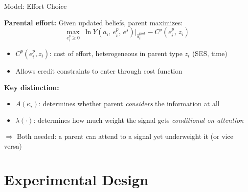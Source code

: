\documentclass[aspectratio=169,11pt]{beamer}
\begin{document}
\begin{frame}{Model: Effort Choice}

\textbf{Parental effort:} Given updated beliefs, parent maximizes:
\[
\max_{e_i^p \geq 0} \; \ln Y\!\left(a_i,\, e_i^p,\, e^s\right)\Big|_{\hat{a}_{i}^{\text{post}}} - C^p(e_i^p,\, z_i)
\]

\begin{itemize}
    \item $C^p(e_i^p, z_i)$: cost of effort, heterogeneous in parent type $z_i$ (SES, time)
    \item Allows credit constraints to enter through cost function
\end{itemize}

\bigskip

\textbf{Key distinction:}
\begin{itemize}
    \item $A(\kappa_i)$: determines whether parent \emph{considers} the information at all
    \item $\lambda(\cdot)$: determines how much weight the signal gets \emph{conditional on attention}
\end{itemize}

\bigskip

$\Rightarrow$ Both needed: a parent can attend to a signal yet underweight it (or vice versa)

\end{frame}

\section{Experimental Design}
\end{document}
